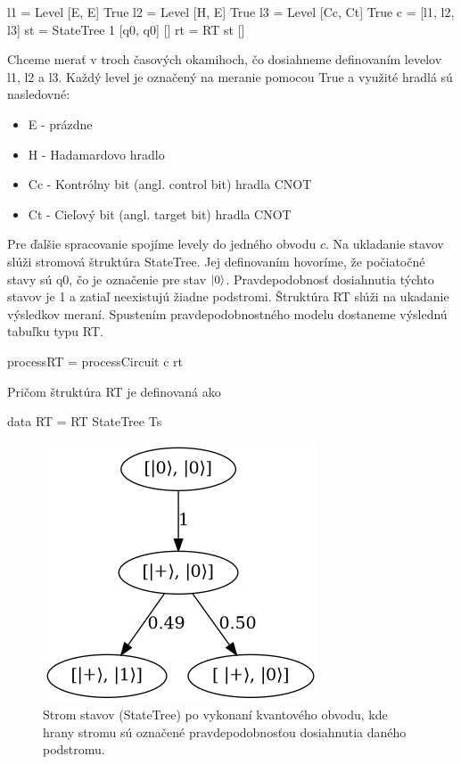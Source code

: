 \begin{code}
l1 = Level [E, E] True
l2 = Level [H, E] True
l3 = Level [Cc, Ct] True
c = [l1, l2, l3]
st = StateTree 1 [q0, q0] []
rt = RT st []
\end{code}

Chceme merať v troch časových okamihoch, čo dosiahneme definovaním levelov
l1, l2 a l3. Každý level je označený na meranie pomocou True a využité hradlá
sú nasledovné:
\begin{itemize}
    \item E - prázdne
    \item H - Hadamardovo hradlo
    \item Cc - Kontrólny bit (angl. control bit) hradla CNOT
    \item Ct - Cieľový bit (angl. target bit) hradla CNOT
\end{itemize}

Pre ďalšie spracovanie spojíme levely  do jedného obvodu \(c\). Na ukladanie
stavov slúži stromová štruktúra StateTree. Jej definovaním hovoríme, že
počiatočné stavy sú q0, čo je označenie pre stav \(\ket{0}\). Pravdepodobnosť
dosiahnutia týchto stavov je 1 a zatiaľ neexistujú žiadne podstromi. Štruktúra
RT slúži na ukadanie výsledkov meraní. Spustením pravdepodobnostného modelu
dostaneme výslednú tabuľku typu RT.

\begin{code}
processRT = processCircuit c rt
\end{code}

Pričom štruktúra RT je definovaná ako
\begin{code}
data RT = RT StateTree Ts
\end{code}

\begin{figure}
	\centering 
	\includegraphics[width=.4\textwidth]{figures/ST.png} 
	\caption{Strom stavov (StateTree) po vykonaní kvantového obvodu,
kde hrany stromu sú označené pravdepodobnosťou dosiahnutia daného podstromu.}
    \label{stateTree}
\end{figure}

